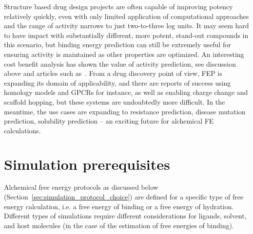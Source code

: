 \documentclass[9pt,bestpractices]{livecoms}
\begin{document}
Structure based drug design projects are often capable of improving potency relatively quickly, even with only limited application of computational approaches and the range of activity narrows to just two-to-three log units. It may seem hard to have impact with substantially different, more potent, stand-out compounds in this scenario, but binding energy prediction can still be extremely useful for ensuring activity is maintained as other properties are optimized. An interesting cost benefit analysis has shown the value of activity prediction, see discussion above and articles such as~\cite{mobley2012perspective}. 
From a drug discovery point of view, FEP is expanding its domain of applicability, and there are reports of success using homology models and GPCRs for instance, as well as enabling charge change and scaffold hopping, but these systems are undoubtedly more difficult.  In the meantime, the use cases are expanding to resistance prediction, disease mutation prediction, solubility prediction – an exciting future for alchemical FE calculations. 
%
%
%
%
\section{Simulation prerequisites}
\label{sec:prerequisites}
Alchemical free energy protocols as discussed below (Section~\ref{sec:simulation_protocol_choice}) are defined for a specific type of free energy calculation, i.e. a free energy of binding or a free energy of hydration. Different types of simulations require different considerations for ligands, solvent, and host molecules (in the case of the estimation of free energies of binding).
\end{document}
